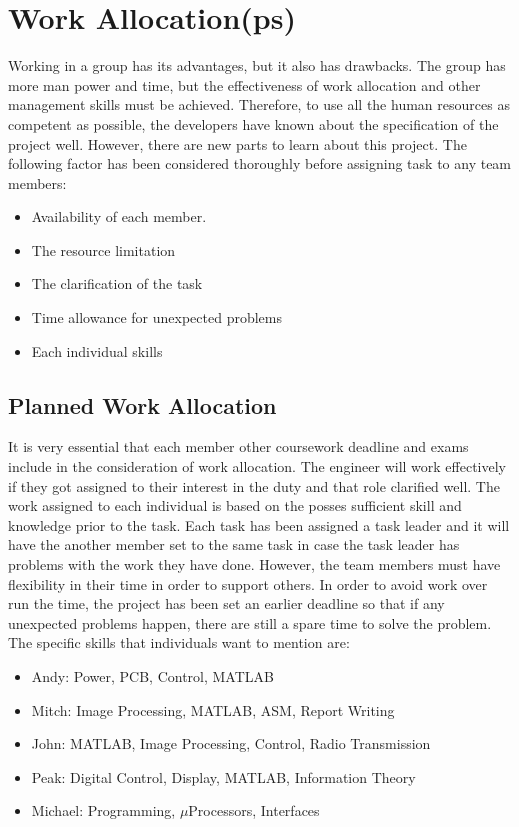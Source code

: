 \section{Work Allocation(ps)}

Working in a group has its advantages, but it also has drawbacks. The group has more man power and time, but the effectiveness of work allocation and other management skills must be achieved. Therefore, to use all the human resources as competent as possible, the developers have known about the specification of the project well. However, there are new parts to learn about this project. The following factor has been considered thoroughly before assigning task to any team members:

\begin{itemize}
\item	Availability of each member.

\item	The resource limitation
 
\item	The clarification of the task

\item   Time allowance for unexpected problems

\item	Each individual skills
\end{itemize}


\subsection*{Planned Work Allocation}
\label{sec:work_plan}
It is very essential that each member other coursework deadline and exams include in the consideration of work allocation. 
The engineer will work effectively if they got assigned  to their interest in the duty and that role clarified well. 
The work assigned to each individual is based on the posses sufficient skill and knowledge prior to the task. 
Each task has been assigned a task leader and it will have the another member set to the same task in case the task leader has problems with the work they have done.
However, the team members must have flexibility in their time in order to support others. 
In order to avoid work over run the time, the project has been set an earlier deadline so that if any unexpected problems happen, there are still a spare time to solve the problem. The specific skills that individuals want to mention are:

\begin{itemize}
\item Andy: Power, PCB, Control, MATLAB
\item Mitch: Image Processing, MATLAB, ASM, Report Writing
\item John: MATLAB, Image Processing, Control, Radio Transmission
\item Peak: Digital Control, Display, MATLAB, Information Theory
\item Michael: Programming, $\mu$Processors, Interfaces
\end{itemize}

